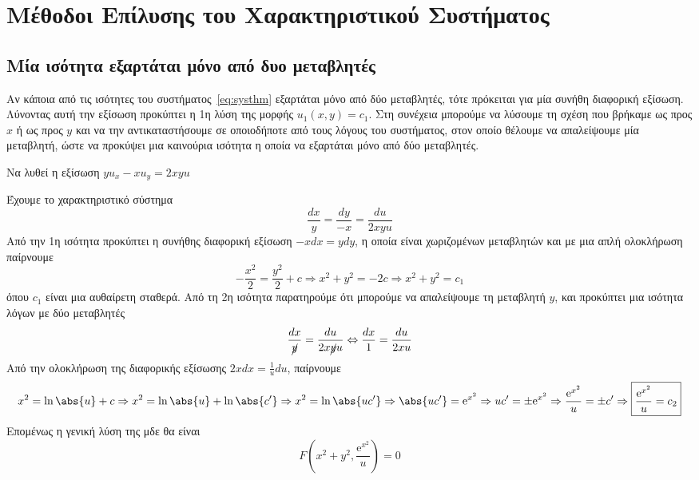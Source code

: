 \section{Μέθοδοι Επίλυσης του Χαρακτηριστικού Συστήματος}

\subsection{Μία ισότητα εξαρτάται μόνο από δυο μεταβλητές}

Αν κάποια από τις ισότητες του συστήματος~\eqref{eq:systhm} εξαρτάται μόνο από 
δύο μεταβλητές, τότε πρόκειται για μία συνήθη διαφορική εξίσωση.
Λύνοντας αυτή την εξίσωση προκύπτει η 1η λύση της μορφής $ u_{1}(x,y)= c_{1} $. 
Στη συνέχεια μπορούμε να λύσουμε τη σχέση που βρήκαμε ως προς $x$ ή ως προς $y$ και 
να την αντικαταστήσουμε σε οποιοδήποτε από τους λόγους του συστήματος, στον οποίο 
θέλουμε να απαλείψουμε μία μεταβλητή, ώστε να προκύψει μια καινούρια ισότητα 
η οποία να  εξαρτάται μόνο από δύο μεταβλητές.

\begin{example}
  Να λυθεί η εξίσωση $ yu_{x}-xu_{y}=2xyu $  
\end{example}
\begin{solution}
  Έχουμε το χαρακτηριστικό σύστημα
  \[
    \frac{dx}{y} = \frac{dy}{-x} = \frac{du}{2xyu} 
  \] 
  Από την 1η ισότητα προκύπτει η συνήθης διαφορική εξίσωση $ -x dx = y dy $, η 
  οποία είναι χωριζομένων μεταβλητών και με μια απλή ολοκλήρωση παίρνουμε 
  \[
    - \frac{x^{2}}{2} = \frac{y^{2}}{2} + c \Rightarrow x^{2}+y^{2}=-2c \Rightarrow
    \boxed{x^{2}+y^{2}= c_{1}}
  \] 
  όπου $ c_{1} $ είναι μια αυθαίρετη σταθερά. Από τη 2η ισότητα παρατηρούμε ότι 
  μπορούμε να απαλείψουμε τη μεταβλητή $y$, και προκύπτει μια ισότητα λόγων με δύο 
  μεταβλητές
  \[
    \frac{dx}{\cancel{y}} = \frac{du}{2x\cancel{y}u} \Leftrightarrow \frac{dx}{1} =
    \frac{du}{2xu} 
  \] 
  Από την ολοκλήρωση της διαφορικής εξίσωσης $2x dx = \frac{1}{u} du$, παίρνουμε
  \[
    x^{2}= \ln{\abs{u}} + c \Rightarrow x^{2}= \ln{\abs{u}} + \ln{\abs{c'}}
    \Rightarrow x^{2}= \ln{\abs{uc'}} \Rightarrow \abs{uc'} = \mathrm{e}^{x^{2}} 
    \Rightarrow uc' = \pm \mathrm{e}^{x^{2}} 
    \Rightarrow \frac{\mathrm{e}^{x^{2}}}{u} = \pm c' \Rightarrow
    \boxed{\frac{\mathrm{e}^{x^{2}}}{u} = c_{2}}
  \] 
  Επομένως η γενική λύση της μδε θα είναι 
  \[
    F\left(x^{2}+y^{2}, \frac{\mathrm{e}^{x^{2}}}{u}\right) = 0
  \] 
\end{solution}


